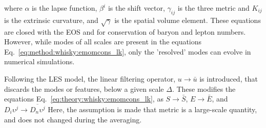 %
where $\alpha$ is the lapse function, $\beta^i$ is the shift vector, 
$\gamma_{ij}$ is the three metric and $K_{ij}$ is the extrinsic curvature, 
and $\sqrt{\gamma}$ is the spatial volume element.
%
These equations are closed with the \ac{EOS} and  for conservation of baryon and 
lepton numbers.
%
However, while modes of all scales are present in the equations Eq.~\eqref{eq:method:whisky:emomcons_lk}, 
only the 'resolved' modes can evolve in numerical simulations. 


Following the \ac{LES} model, the linear filtering operator, $u\rightarrow \bar{u}$ is introduced, that 
discards the modes or features, below a given scale $\Delta$.
These modifies the equations Eq.~\eqref{eq:theory:whisky:emomcons_lk}, as $S\rightarrow\bar{S}$, $E\rightarrow\bar{E}$,
and $D_i\upsilon^j \rightarrow \overline{D_n\upsilon^j}$
%
Here, the assumption is made that metric is a large-scale quantity, and does not changed during the averaging.
%
%

